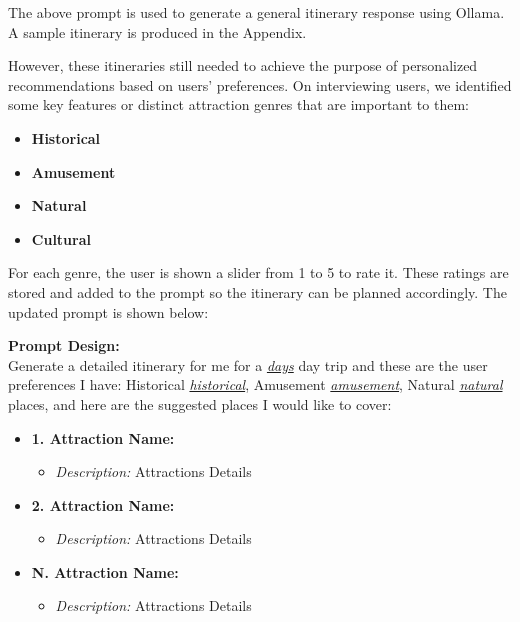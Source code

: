 \documentclass[sigconf,authordraft]{acmart}
\begin{document}
    The above prompt is used to generate a general itinerary response using Ollama. A sample itinerary is produced in the Appendix.

    However, these itineraries still needed to achieve the purpose of personalized recommendations based on users' preferences. On interviewing users, we identified some key features or distinct attraction genres that are important to them:

    \begin{itemize}
      \item \textbf{Historical}
      \item \textbf{Amusement}
      \item \textbf{Natural}
      \item \textbf{Cultural}
    \end{itemize}

    For each genre, the user is shown a slider from 1 to 5 to rate it. These ratings are stored and added to the prompt so the itinerary can be planned accordingly. The updated prompt is shown below:

    \begin{tcolorbox}[linewidth=1pt, innerleftmargin=15pt, innerrightmargin=15pt, innertopmargin=15pt, innerbottommargin=15pt]
      \textbf{Prompt Design:} \\

      Generate a detailed itinerary for me for a \underline{\textit{days}} day trip and these are the user preferences I have:
      Historical \underline{\textit{historical}}, Amusement \underline{\textit{amusement}}, Natural \underline{\textit{natural}} places, and here are the suggested places I would like to cover:

      \begin{itemize}
        \item \textbf{1. Attraction Name:}
        \begin{itemize}
            \item \textit{Description:} Attractions Details
        \end{itemize}
        \item \textbf{2. Attraction Name:}
        \begin{itemize}
            \item \textit{Description:} Attractions Details
        \end{itemize}
        \vspace{2\baselineskip} %
        \item \textbf{N. Attraction Name:}
        \begin{itemize}
            \item \textit{Description:} Attractions Details
        \end{itemize}
      \end{itemize}
    \end{tcolorbox}
\end{document}
